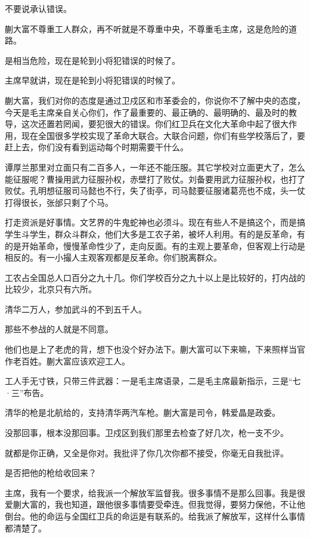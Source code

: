 不要说承认错误。

蒯大富不尊重工人群众，再不听就是不尊重中央，不尊重毛主席，这是危险的道路。

是相当危险，现在是轮到小将犯错误的时候了。

主席早就讲，现在是轮到小将犯错误的时候了。

蒯大富，我们对你的态度是通过卫戍区和市革委会的，你说你不了解中央的态度，今天是毛主席亲自关心你们，作了最重要的、最正确的、最明确的、最及时的教导，这次还置若罔闻，要犯很大的错误。你们红卫兵在文化大革命中起了很大作用，现在全国很多学校实现了革命大联合。大联合问题，你们有些学校落后了，要赶上去，你们没有看到运动每个时期需要干什么。

谭厚兰那里对立面只有二百多人，一年还不能压服。其它学校对立面更大了，怎么能征服呢？曹操用武力征服孙权，赤壁打了败仗。刘备要用武力征服孙权，也打了败仗。孔明想征服司马懿也不行，失了街亭，司马懿要征服诸葛亮也不成，头一仗打得很长，张邰只剩了个马。

打走资派是好事情。文艺界的牛鬼蛇神也必须斗。现在有些人不是搞这个，而是搞学生斗学生，群众斗群众，他们大多是工农子弟，被坏人利用。有的是反革命，有的是开始革命，慢慢革命性少了，走向反面。有的主观上要革命，但客观上行动是相反的。有一小撮人主观客观都是反革命。你们脱离群众。

工农占全国总人口百分之九十几。你们学校百分之九十以上是比较好的，打内战的比较少，北京只有六所。

清华二万人，参加武斗的不到五千人。

那些不参战的人就是不同意。

他们也是上了老虎的背，想下也没个好办法下。蒯大富可以下来嘛，下来照样当官作老百姓。蒯大富应该欢迎工人。

工人手无寸铁，只带三件武器：一是毛主席语录，二是毛主席最新指示，三是“七·三”布告。

清华的枪是北航给的，支持清华两汽车枪。蒯大富是司令，韩爱晶是政委。

没那回事，根本没那回事。卫戍区到我们那里去检查了好几次，枪一支不少。

就都是你正确，又全是你对。我批评了你几次你都不接受，你毫无自我批评。

是否把他的枪给收回来？

主席，我有一个要求，给我派一个解放军监督我。很多事情不是那么回事。我是很爱蒯大富的，我也知道，跟他很多事情要受牵连。但我觉得，要努力保他，不让他倒台。他的命运与全国红卫兵的命运是有联系的。给我派了解放军，这样什么事情都清楚了。

